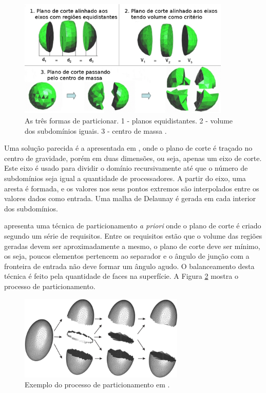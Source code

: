 \begin{figure}[htbp]
     \centering
     \includegraphics[width=0.9\textwidth]{fig/ivanov06.jpg}
     \caption{As três formas de particionar. 1 - planos equidistantes. 2 - volume dos subdomínios iguais. 3 - centro de massa \cite{bib:Ivanov06}.}
     \label{fig:ivanov06}
 \end{figure}

Uma solução parecida é a apresentada em \cite{bib:Lammer00}, onde o plano de corte é traçado no centro de gravidade, porém em duas dimensões, ou seja, apenas um eixo de corte. Este eixo é usado para dividir o domínio recursivamente até que o número de subdomínios seja igual a quantidade de processadores. A partir do eixo, uma aresta é formada, e os valores nos seus pontos extremos são interpolados entre os valores dados como entrada. Uma malha de Delaunay é gerada em cada interior dos subdomínios.


\cite{bib:JURCZYK07} apresenta uma técnica de particionamento \textit{a priori} onde o plano de corte é criado segundo um série de requisitos. Entre os requisitos estão que o volume das regiões geradas devem ser aproximadamente a mesmo, o plano de corte deve ser mínimo, os seja, poucos elementos pertencem ao separador e o ângulo de junção com a fronteira de entrada não deve formar um ângulo agudo. O balanceamento desta técnica é feito pela quantidade de faces na superfície. A Figura \ref{fig:jurczyk} mostra o processo de particionamento.

 
 \begin{figure}[htbp]
     \centering
     \includegraphics[width=0.7\textwidth]{fig/jurczyk.png}
     \caption{Exemplo do processo de particionamento em \cite{bib:JURCZYK07}.}
     \label{fig:jurczyk}
 \end{figure} 


